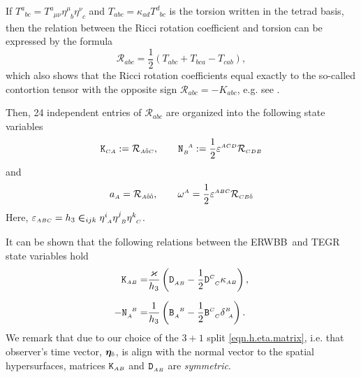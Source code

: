 \documentclass[
10pt, %
a4paper, %
oneside, %
twocolumn,
headinclude,footinclude, %
BCOR5mm, %
]{scrartcl}
\newcommand{\ERWBB}{{ERWBB}}
\newcommand{\sA}{\mathsmaller A}
\newcommand{\sB}{\mathsmaller B}
\newcommand{\sC}{\mathsmaller C}
\newcommand{\sD}{\mathsmaller D}
\newcommand{\mg}[1]{\kappa_{#1}}			%
\newcommand{\MG}[1]{\kappa^{#1}}			%
\newcommand{\tetrsymbol}{h}
\newcommand{\itetrsymbol}{\eta}
\newcommand{\itetr}[2]{\itetrsymbol^{#1}_{\phantom{#1}#2}}
\newcommand{\detTetr}{\tetrsymbol}
\newcommand{\bas}[1]{\bm{\itetrsymbol}_{#1}}
\newcommand{\Tors}[2]{T^{#1}_{\phantom{#1}#2}}
\newcommand{\Dfin}[2]{\mathtt{D}_{\phantom{#2}#1}^{#2}}	%
\newcommand{\Kbuch}[2]{\mathtt{K}_{{#1}{#2}}}	%
\newcommand{\Nbuch}[2]{\mathtt{N}_{#1}^{\ \,#2}}	%
\newcommand{\Bfinmix}[2]{\mathtt{B}^{#1}_{\phantom{#1}#2}}	%
\newcommand{\Bfinmixx}[2]{\mathtt{B}_{#1}^{\phantom{#1}#2}}	%
\newcommand{\LCsymb}{\bm{\in}}    %
\newcommand{\LCtens}{\varepsilon} %
\newcommand{\KD}[2]{\delta^{#1}_{\ #2}}
\newcommand{\indalg}[1]{\hat{\mathsmaller{#1}}}
\newcommand{\lapse}{\alpha}
\begin{document}
	If $ \Tors{a}{bc} = \Tors{a}{\mu\nu}\itetr{\mu}{b}\itetr{\nu}{c} $ and $ \Tors{}{abc} = \mg{ad} 
	\Tors{d}{bc} $ is the torsion written in the tetrad basis, then the relation between the Ricci 
	rotation coefficient and torsion can be expressed by the formula
	\begin{equation}\label{eqn.Ricci.Tors}
		\mathcal{R}_{abc} = \frac{1}{2} 
		\left(  
			\Tors{}{abc} + \Tors{}{bca} - \Tors{}{cab}
		\right),
	\end{equation}
	which also shows that the Ricci rotation coefficients equal exactly to the so-called contortion 
	tensor with the opposite sign $ \mathcal{R}_{abc} =-K_{abc} $, e.g. see 
	\cite[Eq.(1.63)]{AldrovandiPereiraBook}.
	
	Then, 24 independent entries of $ \mathcal{R}_{abc} $ are organized into the following state 
	variables
	\begin{equation}\label{eqn.KN}
		\Kbuch{\sC}{\sA} := \mathcal{R}_{\sA\indalg{0}\sC},
		\qquad
		\Nbuch{\sB}{\sA} := \frac{1}{2} \LCtens^{\sA\sC\sD}\mathcal{R}_{\sC\sD\sB}
	\end{equation}
	and 
	\begin{equation}\label{eqn.aw}
		a_{\sA} = \mathcal{R}_{\sA\indalg{0}\indalg{0}},
		\qquad
		\omega^{\sA} = \frac{1}{2} \LCtens^{\sA\sB\sC} \mathcal{R}_{\sC\sB\indalg{0}}
	\end{equation}
	Here, $ \LCtens_{\sA\sB\sC} = 
	\detTetr_3 \LCsymb_{ijk}\itetr{i}{\sA}\itetr{j}{\sB}\itetr{k}{\sC} $.
	
	It can be shown that the following relations between the \ERWBB\ and TEGR state variables hold
	\begin{subequations}\label{eqn.Buchman.TEGR.KN}
		\begin{align}
			\Kbuch{\sA}{\sB} = & \frac{\varkappa}{\detTetr_3} 
			\left(
			\Dfin{\sA\sB}{}-\frac{1}{2} \Dfin{\sC}{\sC} \mg{\sA\sB}
			\right),\\[2mm]
			-\Nbuch{\sA}{\sB} =&\frac{1}{\detTetr_3}
			\left(
			\Bfinmixx{\sA}{\sB} - \frac{1}{2}\Bfinmix{\sC}{\sC}\KD{\sB}{\sA}
			\right).
		\end{align}
	\end{subequations}
	We remark that due to our choice of the $ 3+1 $ split \eqref{eqn.h.eta.matrix}, i.e. that 
	observer's time vector, $ \bas{\indalg{0}} $, is align with the normal vector to the 
	spatial hypersurfaces, matrices $ \Kbuch{\sA}{\sB} $ and $ \Dfin{\sA\sB}{} $ are 
	\textit{symmetric}.
	
\end{document}

